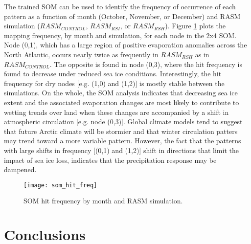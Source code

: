 The trained SOM can be used to identify the frequency of occurrence of each pattern as a function of month (October, November, or December) and RASM simulation ($RASM_{CONTROL}$, $RASM_{RSI}$, or $RASM_{RSH}$).
Figure \ref{fig:som_hit_freq} plots the mapping frequency, by month and simulation, for each node in the 2x4 SOM.
Node (0,1), which has a large region of positive evaporation anomalies across the North Atlantic, occurs nearly twice as frequently in $RASM_{RSH}$ as in $RASM_{CONTROL}$.
The opposite is found in node (0,3), where the hit frequency is found to decrease under reduced sea ice conditions.
Interestingly, the hit frequency for dry nodes [e.g. (1,0) and (1,2)] is mostly stable between the simulations.
On the whole, the SOM analysis indicates that decreasing sea ice extent and the associated evaporation changes are most likely to contribute to wetting trends over land when these changes are accompanied by a shift in atmospheric circulation [e.g. node (0,3)].
Global climate models tend to suggest that future Arctic climate will be stormier \citep{Vavrus_2012} and that winter circulation patters may trend toward a more variable pattern.
However, the fact that the patterns with large shifts in frequency [(0,1) and (1,2)] shift in directions that limit the impact of sea ice loss, indicates that the precipitation response may be dampened.

\begin{figure}
  \centering
  \texttt{[image: som\_hit\_freq]}
  \caption{SOM hit frequency by month and RASM simulation.}
  \label{fig:som_hit_freq}
\end{figure}

\section{Conclusions}
\label{sec:conclusions_ch5}

